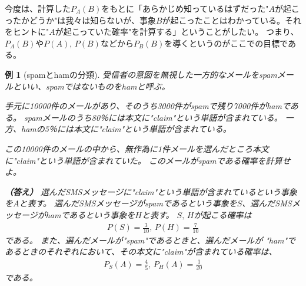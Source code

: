 \documentclass[luatexja,fontsize=12pt]{jlreq}\usepackage{ifthen}\newcounter{enlarge}\setcounter{enlarge}{1}
\newtheorem{eg}{例}
\begin{document}
今度は、計算した$P_A (B)$をもとに「あらかじめ知っているはずだった"$A$が起こったかどうか"は我々は知らないが、事象$B$が起こったことはわかっている。それをヒントに"$A$が起こっていた確率"を計算する」ということがしたい。
つまり、$P_A (B)$や$P(A),\, P(B)$などから$P_B (B)$を導くというのがここでの目標である。

\begin{eg}[spamとhamの分類] \label{eg:10.3}
受信者の意図を無視した一方的なメールをspamメールといい、spamではないものをhamと呼ぶ。

手元に10000件のメールがあり、そのうち3000件がspamで残り7000件がhamである。
spamメールのうち80％には本文に"claim"という単語が含まれている。
一方、hamの5％には本文に"claim"という単語が含まれている。

この10000件のメールの中から、無作為に1件メールを選んだところ本文に"claim"という単語が含まれていた。
このメールがspamである確率を計算せよ。

\textbf{（答え）}
選んだSMSメッセージに"claim"という単語が含まれているという事象を$A$と表す。
選んだSMSメッセージがspamであるという事象を$S$、選んだSMSメッセージがhamであるという事象を$H$と表す。
$S,\, H$が起こる確率は
\begin{align} \label{eq:10.4.1}
P(S) = \frac{3}{10},\, P(H) = \frac{7}{10}
\end{align}
である。
また、選んだメールが"spam"であるときと、選んだメールが "ham"であるときのそれぞれにおいて、その本文に"claim"が含まれている確率は、
\begin{align} \label{eq:10.4.2}
P_S (A) = \frac{4}{5} ,\, P_H (A) = \frac{1}{20}
\end{align}
である。


\end{eg}
\end{document}
